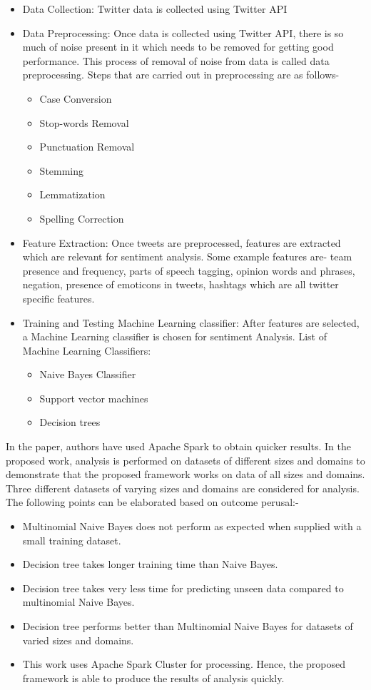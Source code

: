 \documentclass[conference]{IEEEtran}
\begin{document}
\begin{itemize}
	\item Data Collection: Twitter data is collected using Twitter API
	\item Data Preprocessing: Once data is collected using Twitter API, there is so much of noise present in it which needs to be removed for getting good performance. This process of removal of noise from data is called data preprocessing.
	Steps that are carried out in preprocessing are as follows-
	\begin{itemize}
		\item Case Conversion 
		\item Stop-words Removal
		\item Punctuation Removal
		\item Stemming
		\item Lemmatization
		\item Spelling Correction
	\end{itemize}
	\item Feature Extraction: Once tweets are preprocessed, features are extracted which are relevant for sentiment analysis. Some example features are- team presence and frequency, parts of speech tagging, opinion words and phrases, negation, presence of emoticons in tweets, hashtags which are all twitter specific features.
	\item Training and Testing Machine Learning classifier: After features are selected, a Machine Learning classifier is chosen for sentiment Analysis. List of Machine Learning Classifiers:
	\begin{itemize}
		\item Naive Bayes Classifier
		\item Support vector machines
		\item Decision trees
	\end{itemize}
	
\end{itemize}	
In the paper\cite{b9}, authors have used Apache Spark to obtain quicker results. In the proposed work, analysis is performed on datasets of different sizes and domains to demonstrate that the proposed framework works on data of all sizes and domains. Three different datasets of varying sizes and domains are considered for analysis.\\
The following points can be elaborated based on outcome perusal:-
\begin{itemize}
	\item Multinomial Naive Bayes does not perform as expected when supplied with a small training dataset.
	\item Decision tree takes longer training time than Naive Bayes.
	\item Decision tree takes very less time for predicting unseen data compared to multinomial Naive Bayes.
	\item Decision tree performs better than Multinomial Naive Bayes for datasets of varied sizes and domains.
	\item This work uses Apache Spark Cluster for processing. Hence, the proposed framework is able to produce the results of analysis quickly.
\end{itemize}
\end{document}
